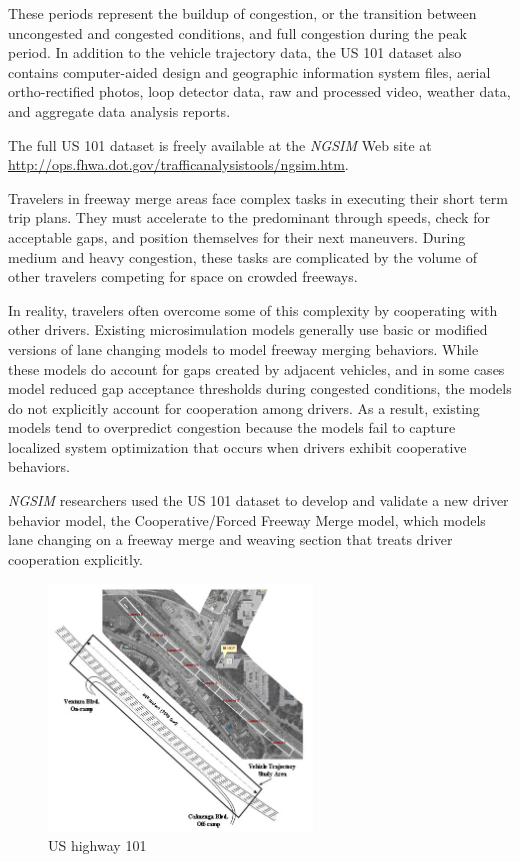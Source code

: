 These periods represent the buildup of congestion, or the transition between uncongested and congested conditions, and full congestion during the peak period. In addition to the vehicle trajectory data, the US 101 dataset also contains computer-aided design and geographic information system files, aerial ortho-rectified photos, loop detector data, raw and processed video, weather data, and aggregate data analysis reports.

The full US 101 dataset is freely available at the {\it NGSIM} Web site at \url{http://ops.fhwa.dot.gov/trafficanalysistools/ngsim.htm}.

Travelers in freeway merge areas face complex tasks in executing their short term trip plans. They must accelerate to the predominant through speeds, check for acceptable gaps, and position themselves for their next maneuvers. During medium and heavy congestion, these tasks are complicated by the volume of other travelers competing for space on crowded freeways.

In reality, travelers often overcome some of this complexity by cooperating with other drivers. Existing microsimulation models generally use basic or modified versions of lane changing models to model freeway merging behaviors. While these models do account for gaps created by adjacent vehicles, and in some cases model reduced gap acceptance thresholds during congested conditions, the models do not explicitly account for cooperation among drivers. As a result, existing models tend to overpredict congestion because the models fail to capture localized system optimization that occurs when drivers exhibit cooperative behaviors.

{\it NGSIM} researchers used the US 101 dataset to develop and validate a new driver behavior model, the Cooperative/Forced Freeway Merge model, which models lane changing on a freeway merge and weaving section that treats driver cooperation explicitly.

\begin{figure}[H]
\begin{center}
\includegraphics[width=7cm]{./figures/07030fig1.jpg}
\caption{US highway 101}
\label{fig:pict_us101}
\end{center}
\end{figure}








